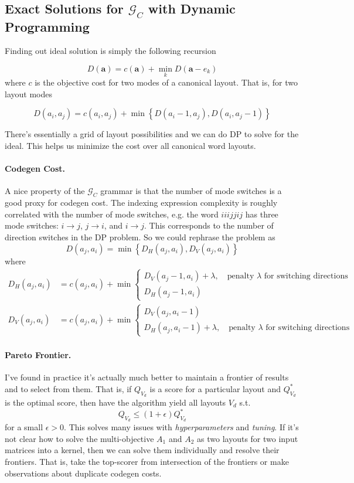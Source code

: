 \documentclass[10pt]{article}
\theoremstyle{remark}
\begin{document}
\subsection{Exact Solutions for $\mathcal{G}_C$ with Dynamic Programming}

Finding out ideal solution is simply the following recursion 

\[
D(\bm a) = c(\bm a) + \min_{k} D(\bm a-e_k)
\]
where $c$ is the objective cost for two modes of a canonical layout.
That is, for two layout modes

\[
D(a_i, a_j) = c(a_i, a_j) + \min \left\{ D(a_i -1, a_j), D(a_i, a_j-1) \right\}
\]

There's essentially a grid of layout possibilities and we can do DP to solve for the ideal. This helps us minimize the cost over all canonical word layouts.

\paragraph{Codegen Cost.} A nice property of the $\mathcal{G}_C$ grammar is that the number of mode switches is a good proxy for codegen cost. The indexing expression complexity is roughly correlated with the number of mode switches, e.g. the word $iiijjij$ has three mode switches: $i\rightarrow j$, $j\rightarrow i$, and $i\rightarrow j$. This corresponds to the number of direction switches in the DP problem. So we could rephrase the problem as 
%
\[
D(a_j, a_i) = \min\left\{ D_H(a_j, a_i), D_V(a_j, a_i) \right\}
\]
%
where
%
\[
\begin{aligned}
D_H(a_j, a_i) &= c(a_j, a_i) + \min \begin{cases}
    D_V(a_j-1,a_i) + \lambda, \quad \text{penalty } \lambda \text{ for switching directions} \\
    D_H(a_j-1, a_i)
\end{cases} \\
D_V(a_j, a_i) &= c(a_j, a_i) + \min \begin{cases}
    D_V(a_j, a_i-1) \\
    D_H(a_j, a_i-1) + \lambda, \quad \text{penalty } \lambda \text{ for switching directions} 
\end{cases}
\end{aligned}
\]

\paragraph{Pareto Frontier.} I've found in practice it's actually much better to maintain a frontier of results and to select from them.
That is, if $Q_{V_d}$ is a score for a particular layout and $Q_{V_d}^*$ is the optimal score, then have the algorithm yield all layouts $V_d$ s.t.
%
\[
    Q_{V_d} \le (1 + \epsilon) Q_{V_d}^*
\]
%
for a small $\epsilon>0$. This solves many issues with {\it hyperparameters} and {\it tuning}. If it's not clear how to solve the multi-objective $A_1$ and $A_2$ as two layouts for two input matrices into a kernel, then we can solve them individually and resolve their frontiers. That is, take the top-scorer from intersection of the frontiers or make observations about duplicate codegen costs.
\end{document}
